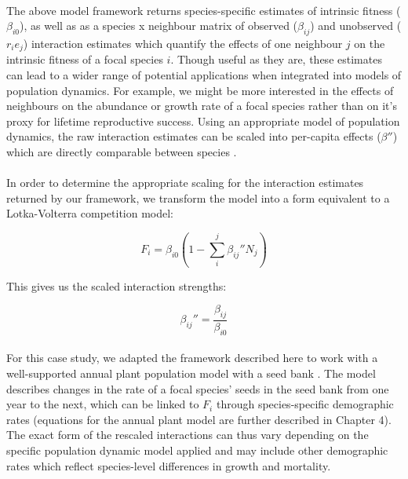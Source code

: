 \documentclass[a4,12pt]{article}
\begin{document}
        \paragraph{}
        The above model framework returns species-specific estimates of intrinsic fitness ($\beta_{i0}$), as well as as a species x neighbour matrix of observed ($\beta_{ij}$) and unobserved ($r_i e_j$) interaction estimates which quantify the effects of one neighbour $j$ on the intrinsic fitness of a focal species $i$. Though useful as they are, these estimates can lead to a wider range of potential applications when integrated into models of population dynamics. For example, we might be more interested in the effects of neighbours on the abundance or growth rate of a focal species rather than on it's proxy for lifetime reproductive success. Using an appropriate model of population dynamics, the raw interaction estimates can be scaled into per-capita effects (${\beta}''$) which are directly comparable between species \parencite{Godoy2014, Bimler2018}. %

        \paragraph{}
        In order to determine the appropriate scaling for the interaction estimates returned by our framework, we transform the model into a form equivalent to a Lotka-Volterra competition model: 

        \begin{equation}
        F_{i} = \beta_{i0} \left ( 1 - \sum_{i}^{j} {\beta_{ij}}'' N_{j} \right )
        \label{LVform}
        \end{equation}

        This gives us the scaled interaction strengths: 
 
        \begin{equation}
        {\beta_{ij}}'' = \frac{\beta_{ij}}{\beta_{i0}}
        \label{scaling}
        \end{equation}

        \paragraph{}
        For this case study, we adapted the framework described here to work with a well-supported annual plant population model with a seed bank \parencite{Bimler2018}. The model describes changes in the rate of a focal species' seeds in the seed bank from one year to the next, which can be linked to $F_i$ through species-specific demographic rates (equations for the annual plant model are further described in Chapter 4). The exact form of the rescaled interactions can thus vary depending on the specific population dynamic model applied and may include other demographic rates which reflect species-level differences in growth and mortality.
\end{document}
